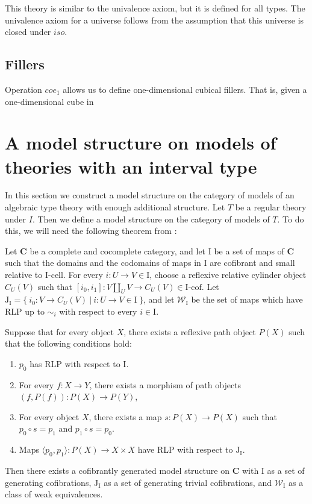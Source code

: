 \documentclass[reqno]{amsart}
\theoremstyle{definition}
\theoremstyle{remark}
\newcommand{\cat}[1]{\mathbf{#1}}
\newcommand{\C}{\cat{C}}
\newcommand{\we}{\mathcal{W}}
\newcommand{\I}{\mathrm{I}}
\newcommand{\J}{\mathrm{J}}
\newcommand{\class}[2]{#1\text{-}\mathrm{#2}}
\newcommand{\Icell}[1][\I]{\class{#1}{cell}}
\newcommand{\Icof}[1][\I]{\class{#1}{cof}}
\newcommand{\cyli}{i}
\numberwithin{figure}{section}
\begin{document}
This theory is similar to the univalence axiom, but it is defined for all types.
The univalence axiom for a universe follows from the assumption that this universe is closed under $iso$.

\subsection{Fillers}

Operation $coe_1$ allows us to define one-dimensional cubical fillers.
That is, given a one-dimensional cube in 


\section{A model structure on models of theories with an interval type}

In this section we construct a model structure on the category of models of an algebraic type theory with enough additional structure.
Let $T$ be a regular theory under $I$.
Then we define a model structure on the category of models of $T$.
To do this, we will need the following theorem from \cite{f-model-structures}:
\begin{thm}
Let $\C$ be a complete and cocomplete category, and let $\I$ be a set of maps of $\C$
such that the domains and the codomains of maps in $\I$ are cofibrant and small relative to $\Icell$.
For every $i : U \to V \in \I$, choose a reflexive relative cylinder object $C_U(V)$
such that $[\cyli_0,\cyli_1] : V \amalg_U V \to C_U(V) \in \Icof$.
Let $\J_\I = \{\ \cyli_0 : V \to C_U(V)\ |\ i : U \to V \in \I \ \}$, and
let $\we_\I$ be the set of maps which have RLP up to $\sim_i$ with respect to every $i \in \I$.

Suppose that for every object $X$, there exists a reflexive path object $P(X)$ such that the following conditions hold:
\begin{enumerate}
\item $p_0$ has RLP with respect to $\I$.
\item For every $f : X \to Y$, there exists a morphism of path objects $(f,P(f)) : P(X) \to P(Y)$,
\item For every object $X$, there exists a map $s : P(X) \to P(X)$ such that $p_0 \circ s = p_1$ and $p_1 \circ s = p_0$.
\item Maps $\langle p_0, p_1 \rangle : P(X) \to X \times X$ have RLP with respect to $\J_\I$.
\end{enumerate}
Then there exists a cofibrantly generated model structure on $\C$ with $\I$ as a set of generating cofibrations,
$\J_\I$ as a set of generating trivial cofibrations, and $\we_\I$ as a class of weak equivalences.
\end{thm}
\end{document}
